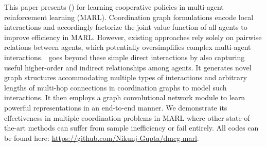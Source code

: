 
This paper presents \textit{\algosmall} (\algoabb) for learning cooperative policies in multi-agent reinforcement learning (MARL). Coordination graph formulations encode local interactions and accordingly factorize the joint value function of all agents to improve efficiency in MARL. However, existing approaches rely solely on pairwise relations between agents, which potentially oversimplifies complex multi-agent interactions. \algoabb\ goes beyond these simple direct interactions by also capturing useful higher-order and indirect relationships among agents. It generates novel graph structures accommodating multiple types of interactions and arbitrary lengths of multi-hop connections in coordination graphs to model such interactions. It then employs a graph convolutional network module to learn powerful representations in an end-to-end manner. We demonstrate its effectiveness in multiple coordination problems in MARL where other state-of-the-art methods can suffer from sample inefficiency or fail entirely. All codes can be found here: {\color{blue}\url{https://github.com/Nikunj-Gupta/dmcg-marl}}. 

